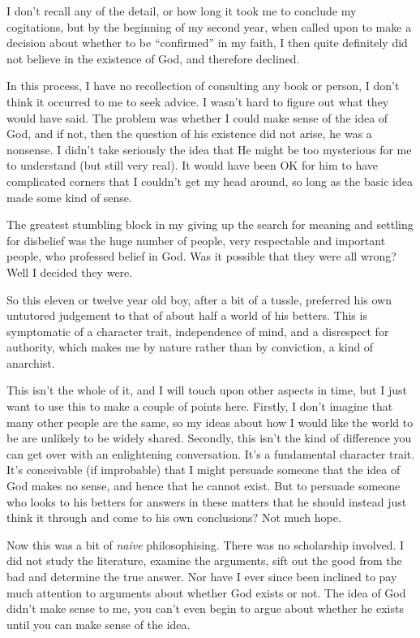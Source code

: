 I don't recall any of the detail, or how long it took me to conclude my cogitations, but by the beginning of my second year, when called upon to make a decision about whether to be ``confirmed'' in my faith, I then quite definitely did not believe in the existence of God, and therefore declined.

In this process, I have no recollection of consulting any book or person, I don't think it occurred to me to seek advice.
I wasn't hard to figure out what they would have said.
The problem was whether I could make sense of the idea of God, and if not, then the question of his existence did not arise, he was a nonsense.
I didn't take seriously the idea that He might be too mysterious for me to understand (but still very real).
It would have been OK for him to have complicated corners that I couldn't get my head around, so long as the basic idea made some kind of sense.

The greatest stumbling block in my giving up the search for meaning and settling for disbelief was the huge number of people, very respectable and important people, who professed belief in God.
Was it possible that they were all wrong?
Well I decided they were.

So this eleven or twelve year old boy, after a bit of a tussle, preferred his own untutored judgement to that of about half a world of his betters.
This is symptomatic of a character trait, independence of mind, and a disrespect for authority, which makes me by nature rather than by conviction, a kind of anarchist.

This isn't the whole of it, and I will touch upon other aspects in time, but I just want to use this to make a couple of points here.
Firstly, I don't imagine that many other people are the same, so my ideas about how I would like the world to be are unlikely to be widely shared.
Secondly, this isn't the kind of difference you can get over with an enlightening conversation.
It's a fundamental character trait.
It's conceivable (if improbable) that I might persuade someone that the idea of God makes no sense, and hence that he cannot exist.
But to persuade someone who looks to his betters for answers in these matters that he should instead just think it through and come to his own conclusions?
Not much hope.

Now this was a bit of {\it naive} philosophising.
There was no scholarship involved.
I did not study the literature, examine the arguments, sift out the good from the bad and determine the true answer.
Nor have I ever since been inclined to pay much attention to arguments about whether God exists or not.
The idea of God didn't make sense to me, you can't even begin to argue about whether he exists until you can make sense of the idea.


